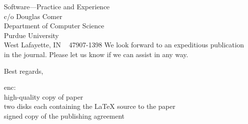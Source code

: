 \documentclass{letter}
\begin{document}
\begin{letter}{
Software---Practice and Experience \\
c/o Douglas Comer \\
Department of Computer Science \\
Purdue University \\
West Lafayette, IN ~ 47907-1398}
We look forward to an expeditious publication in the journal.  Please
let us know if we can assist in any way.
    
\closing{Best regards,}

enc:\\
high-quality copy of paper\\
two disks each containing the \LaTeX{} source to the paper \\
signed copy of the publishing agreement
\end{letter}
\end{document}

